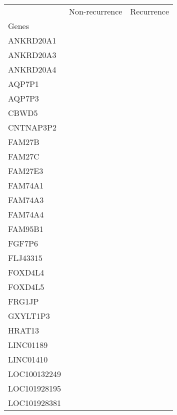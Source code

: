 \begin{tabular}{lcc}
\toprule
{} & Non-recurrence & Recurrence \\
Genes              &                &            \\
\midrule
ANKRD20A1          &                &            \\
ANKRD20A3          &                &            \\
ANKRD20A4          &                &            \\
AQP7P1             &                &            \\
AQP7P3             &                &            \\
CBWD5              &                &            \\
CNTNAP3P2          &                &            \\
FAM27B             &                &            \\
FAM27C             &                &            \\
FAM27E3            &                &            \\
FAM74A1            &                &            \\
FAM74A3            &                &            \\
FAM74A4            &                &            \\
FAM95B1            &                &            \\
FGF7P6             &                &            \\
FLJ43315           &                &            \\
FOXD4L4            &                &            \\
FOXD4L5            &                &            \\
FRG1JP             &                &            \\
GXYLT1P3           &                &            \\
HRAT13             &                &            \\
LINC01189          &                &            \\
LINC01410          &                &            \\
LOC100132249       &                &            \\
LOC101928195       &                &            \\
LOC101928381       &                &            \\

\end{tabular}
